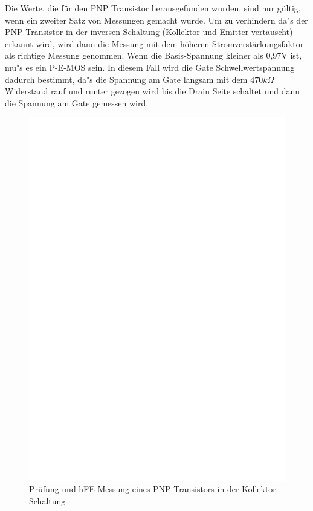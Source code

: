 Die Werte, die f\"ur den PNP Transistor herausgefunden wurden, sind nur g\"ultig, wenn ein zweiter Satz
von Messungen gemacht wurde.
Um zu verhindern da"s der PNP Transistor in der inversen Schaltung (Kollektor und Emitter vertauscht) erkannt
wird, wird dann die Messung mit dem h\"oheren Stromverst\"arkungsfaktor als richtige Messung genommen.
Wenn die Basis-Spannung kleiner als 0,97V ist, mu"s es ein P-E-MOS sein.
In diesem Fall wird die Gate Schwellwertspannung dadurch bestimmt, da"s die Spannung am Gate langsam mit dem
 \(470k\Omega\) Widerstand rauf und runter gezogen wird bis die Drain Seite schaltet und dann
die Spannung am Gate gemessen wird.

\begin{figure}[H]
\centering
\includegraphics[]{../FIG/PNPce.eps}
\caption{Pr\"ufung und hFE Messung eines PNP Transistors in der Kollektor-Schaltung}
\label{fig:pnpce}
\end{figure}

